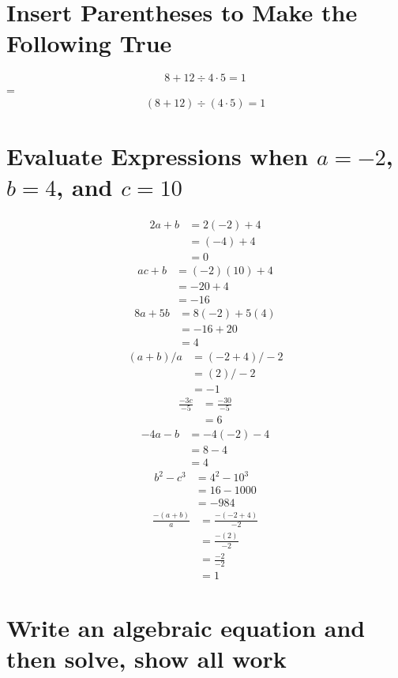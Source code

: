 \documentclass[11pt]{article} %
\begin{document}
\section{Insert Parentheses to Make the Following True}
\[ 8 + 12 \div 4 \cdot 5 = 1 \] = \[ (8 + 12) \div (4 \cdot 5) = 1 \]

\section{Evaluate Expressions when $a=-2$, $b = 4$, and $c = 10$}
\begin{align*}
2a + b &= 2 (-2) + 4 \\
&= (-4) + 4 \\
&= 0
\end{align*}
\begin{align*}
ac + b &= (-2)(10) + 4 \\
&= -20 + 4 \\
&= -16
\end{align*}
\begin{align*}
8a + 5b &= 8(-2) + 5(4) \\
&= -16 + 20 \\
&= 4
\end{align*}
\begin{align*}
(a + b)/a &= (-2 + 4)/-2 \\
&= (2)/-2 \\
&= -1
\end{align*}
\begin{align*}
\frac{-3c}{-5} &= \frac{-30}{-5} \\
&= 6
\end{align*}
\begin{align*}
-4a - b &= -4(-2) - 4 \\
&= 8 - 4 \\
&= 4
\end{align*}
\begin{align*}
b^2 - c^3 &= 4^2 - 10^3 \\
&= 16 - 1000 \\
&= -984
\end{align*}
\begin{align*}
\frac{-(a+b)}{a} &= \frac{-(-2 + 4)}{-2} \\
&= \frac{-(2)}{-2} \\
&= \frac{-2}{-2} \\
&= 1
\end{align*}

\section{Write an algebraic equation and then solve, show all work}
\end{document}
